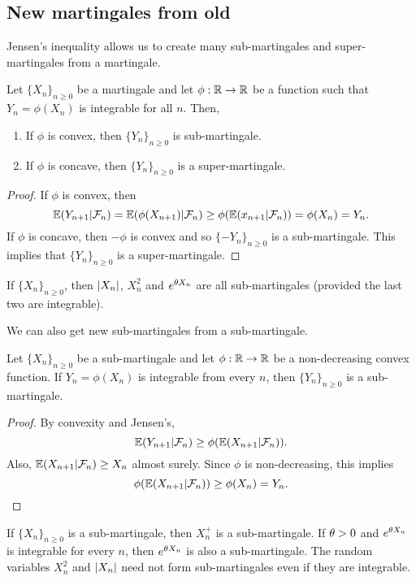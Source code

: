 \subsection{New  martingales from old}
Jensen's inequality allows us to create many sub-martingales and super-martingales from a martingale.
\begin{proposition}
    Let $\{X_n\}_{n \ge 0}$ be  a martingale and  let  $\phi : {\mathbb R} \to {\mathbb R}$ be a function such  that $Y_n = \phi(X_n)$ is integrable for all $n$.  Then,
    \begin{enumerate}
        \item If $\phi$ is convex, then $\{Y_n\}_{n \ge  0}$ is sub-martingale.
        \item If $\phi$ is concave,  then $\{Y_n\}_{n \ge 0}$ is a super-martingale.
    \end{enumerate}
\end{proposition}
\begin{proof}
    If $\phi$ is convex, then
    \[{\mathbb{E}}(Y_{n+1}|{\mathcal{F}}_n) = {\mathbb{E}}(\phi(X_{n+1})|{\mathcal{F}}_n) \ge \phi({\mathbb{E}}(x_{n+1}|{\mathcal{F}}_n)) =\phi(X_n)=Y_n. \]
    If $\phi$ is concave, then $-\phi$ is convex  and so $\{-Y_n\}_{n \ge 0}$ is a sub-martingale. This  implies that $\{Y_n\}_{n \ge 0}$ is a super-martingale. 
\end{proof}
\begin{example}
    If $\{X_n\}_{n \ge 0}$, then ${\left\lvert X_n\right\rvert}$, $X_n^2$ and $e^{{\theta} X_n}$ are all sub-martingales (provided the last two are integrable). 
\end{example}
We can also get new sub-martingales from a sub-martingale.
\begin{proposition}
    Let $\{X_n\}_{n \ge 0}$ be a sub-martingale and  let $\phi:{\mathbb R}\to {\mathbb R}$ be a  non-decreasing convex function. If $Y_n = \phi(X_n)$ is integrable from every $n$, then $\{Y_n\}_{n \ge 0}$ is a sub-martingale.
\end{proposition}
\begin{proof}
    By convexity and Jensen's,
    \[{\mathbb{E}}(Y_{n+1}|{\mathcal{F}}_n) \ge \phi({\mathbb{E}}(X_{n+1}|{\mathcal{F}}_n)). \]
    Also, ${\mathbb{E}}(X_{n+1}|{\mathcal{F}}_n) \ge X_n$ almost surely. Since $\phi$ is non-decreasing, this implies
    \[\phi({\mathbb{E}}(X_{n+1}|{\mathcal{F}}_n)) \ge \phi(X_n)  =Y_n.\qedhere \]
\end{proof}
\begin{example}
    If $\{X_n\}_{n \ge  0}$ is a  sub-martingale, then $X_n^+$ is a sub-martingale. If ${\theta} > 0$ and $e^{{\theta} X_n}$ is integrable for every $n$, then $e^{{\theta} X_n}$ is also a sub-martingale. The random  variables $X_n^2$  and ${\left\lvert X_n\right\rvert}$  need not form sub-martingales  even if they  are integrable. 
\end{example}
